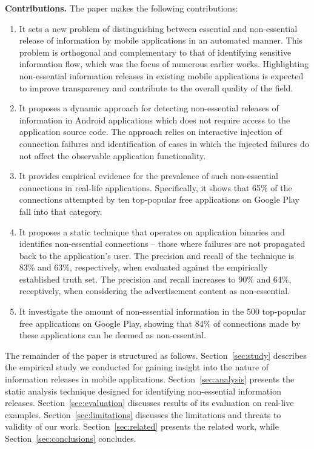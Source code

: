 \vspace{0.1in}
\noindent 
{\bf Contributions.}
The paper makes the following contributions:
\begin{enumerate}
\item It sets a new problem of distinguishing between essential and non-essential release of information by mobile applications in an automated manner. This problem is orthogonal and complementary to that of identifying sensitive information flow, which was the focus of numerous earlier works. 
Highlighting non-essential information releases in existing mobile applications is expected to improve transparency and contribute to the overall quality of the field. 
\item It proposes a dynamic approach for detecting non-essential releases of information in Android applications which does not require access to the application source code. 
The approach relies on interactive injection of connection failures and identification of cases in which the injected failures do not affect the observable application functionality. 
\item It provides empirical evidence for the prevalence of such non-essential connections in real-life applications. Specifically, it shows that 65\% of the connections attempted by ten top-popular free applications on Google Play fall into that category.    
\item It proposes a static technique that operates on application binaries and identifies non-essential connections -- those where failures are not propagated back to the application's user. The precision and recall of the technique is 83\% and 63\%, respectively, when evaluated against the empirically established truth set. 
The precision and recall increases to 90\% and 64\%, receptively, when considering the advertisement content as non-essential.
\item It investigate the amount of non-essential information in the 500 top-popular free applications on Google Play, showing that 84\% of connections made by these applications can be 
deemed as non-essential.
\end{enumerate}

The remainder of the paper is structured as follows. Section~\ref{sec:study} describes the empirical study we conducted for gaining insight into the nature of information releases in mobile applications. Section~\ref{sec:analysis} presents the static analysis technique designed for identifying non-essential information releases. 
Section~\ref{sec:evaluation} discusses results of its evaluation on real-live examples. Section~\ref{sec:limitations} discusses the limitations and threats to validity of our work. Section~\ref{sec:related} presents the related work, while Section~\ref{sec:conclusions} concludes. 



